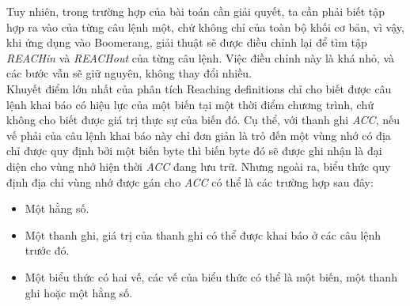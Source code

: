 Tuy nhiên, trong trường hợp của bài toán cần giải quyết, ta cần phải biết tập hợp ra vào của từng câu lệnh một, chứ không chỉ của toàn bộ khối cơ bản, vì vậy, khi ứng dụng vào Boomerang, giải thuật sẽ được điều chỉnh lại để tìm tập \textit{REACHin} và \textit{REACHout} của từng câu lệnh. Việc điều chỉnh này là khá nhỏ, và các bước vẫn sẽ giữ nguyên, không thay đổi nhiều.\\

Khuyết điểm lớn nhất của phân tích Reaching definitions chỉ cho biết được câu lệnh khai báo có hiệu lực của một biến tại một thời điểm chương trình, chứ không cho biết được giá trị thực sự của biến đó. Cụ thể, với thanh ghi \textit{ACC}, nếu vế phải của câu lệnh khai báo này chỉ đơn giản là trỏ đến một vùng nhớ có địa chỉ được quy định bởi một biến byte thì biến byte đó sẽ được ghi nhận là đại diện cho vùng nhớ hiện thời \textit{ACC} đang lưu trữ. Nhưng ngoài ra, biểu thức quy định địa chỉ vùng nhớ được gán cho \textit{ACC} có thể là các trường hợp sau đây:
\begin{itemize}
	\item Một hằng số.
		\item Một thanh ghi, giá trị của thanh ghi có thể được khai báo ở các câu lệnh trước đó.
	\item Một biểu thức có hai vế, các vế của biểu thức có thể là một biến, một thanh ghi hoặc một hằng số.

\end{itemize}

